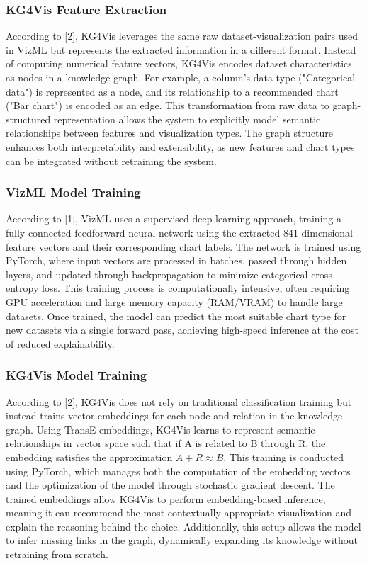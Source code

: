 \subsubsection{ KG4Vis Feature Extraction}
According to [2], KG4Vis leverages the same raw dataset-visualization pairs used in VizML but represents the extracted information in a different format. Instead of computing numerical feature vectors, KG4Vis encodes dataset characteristics as nodes in a knowledge graph. For example, a column's data type ("Categorical data") is represented as a node, and its relationship to a recommended chart ("Bar chart") is encoded as an edge. This transformation from raw data to graph-structured representation allows the system to explicitly model semantic relationships between features and visualization types. The graph structure enhances both interpretability and extensibility, as new features and chart types can be integrated without retraining the system.

\subsubsection{ VizML Model Training}
According to [1], VizML uses a supervised deep learning approach, training a fully connected feedforward neural network using the extracted 841-dimensional feature vectors and their corresponding chart labels. The network is trained using PyTorch, where input vectors are processed in batches, passed through hidden layers, and updated through backpropagation to minimize categorical cross-entropy loss. This training process is computationally intensive, often requiring GPU acceleration and large memory capacity (RAM/VRAM) to handle large datasets. Once trained, the model can predict the most suitable chart type for new datasets via a single forward pass, achieving high-speed inference at the cost of reduced explainability.

\subsubsection{ KG4Vis Model Training}
According to [2], KG4Vis does not rely on traditional classification training but instead trains vector embeddings for each node and relation in the knowledge graph. Using TransE embeddings, KG4Vis learns to represent semantic relationships in vector space such that if A is related to B through R, the embedding satisfies the approximation $A + R \approx B$. This training is conducted using PyTorch, which manages both the computation of the embedding vectors and the optimization of the model through stochastic gradient descent. The trained embeddings allow KG4Vis to perform embedding-based inference, meaning it can recommend the most contextually appropriate visualization and explain the reasoning behind the choice. Additionally, this setup allows the model to infer missing links in the graph, dynamically expanding its knowledge without retraining from scratch.

